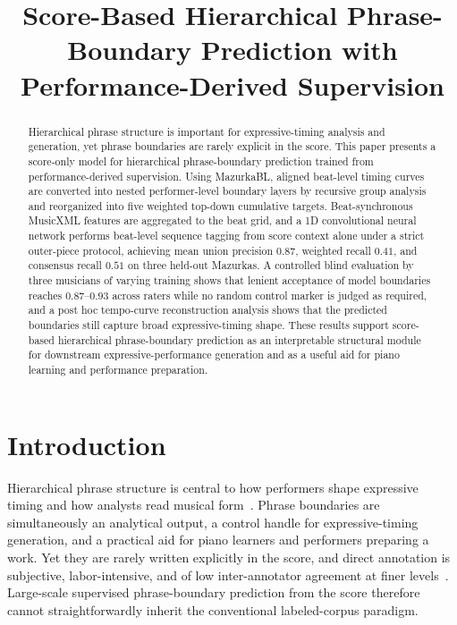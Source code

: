 \documentclass{article}
\title{Score-Based Hierarchical Phrase-Boundary Prediction with Performance-Derived Supervision}
\begin{document}
\maketitle

\begin{abstract}
Hierarchical phrase structure is important for expressive-timing analysis and generation, yet phrase boundaries are rarely explicit in the score. This paper presents a score-only model for hierarchical phrase-boundary prediction trained from performance-derived supervision. Using MazurkaBL, aligned beat-level timing curves are converted into nested performer-level boundary layers by recursive group analysis and reorganized into five weighted top-down cumulative targets. Beat-synchronous MusicXML features are aggregated to the beat grid, and a 1D convolutional neural network performs beat-level sequence tagging from score context alone under a strict outer-piece protocol, achieving mean union precision $0.87$, weighted recall $0.41$, and consensus recall $0.51$ on three held-out Mazurkas. A controlled blind evaluation by three musicians of varying training shows that lenient acceptance of model boundaries reaches $0.87$--$0.93$ across raters while no random control marker is judged as required, and a post hoc tempo-curve reconstruction analysis shows that the predicted boundaries still capture broad expressive-timing shape. These results support score-based hierarchical phrase-boundary prediction as an interpretable structural module for downstream expressive-performance generation and as a useful aid for piano learning and performance preparation.
\end{abstract}

\section{Introduction}\label{sec:introduction}

Hierarchical phrase structure is central to how performers shape expressive timing and how analysts read musical form~\cite{Todd1985ExpressiveTiming,Li2016ExpressiveTimingThesis}. Phrase boundaries are simultaneously an analytical output, a control handle for expressive-timing generation, and a practical aid for piano learners and performers preparing a work. Yet they are rarely written explicitly in the score, and direct annotation is subjective, labor-intensive, and of low inter-annotator agreement at finer levels~\cite{McFee2017HierarchicalAnnotations,Wang2017CrowdsourcingSegmentation}. Large-scale supervised phrase-boundary prediction from the score therefore cannot straightforwardly inherit the conventional labeled-corpus paradigm.
\end{document}
